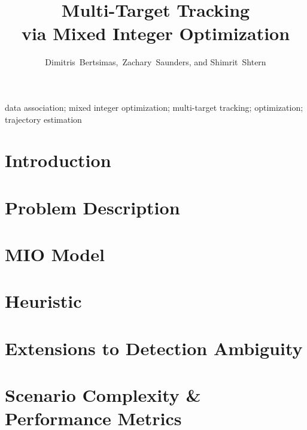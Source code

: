 \documentclass[journal]{IEEEtran}
\begin{document}
\title{Multi-Target Tracking\\ via Mixed Integer Optimization}


\author{Dimitris~Bertsimas,~Zachary~Saunders, and Shimrit~Shtern}

\maketitle

\begin{abstract}

\end{abstract}

\begin{IEEEkeywords}
data association; mixed integer optimization; multi-target tracking; optimization; trajectory estimation
\end{IEEEkeywords}

\section{Introduction}\label{sec: Intro}


\section{Problem Description}\label{sec:Problem Description}


\section{MIO Model}\label{sec:Basic MIO Model}


\section{Heuristic} \label{sec:Heuristic}


\section{Extensions to Detection Ambiguity}\label{sec:Robust MIO Model}


\section{Scenario Complexity \& Performance Metrics} \label{sec:Scenario-Performance}

 
\end{document}
